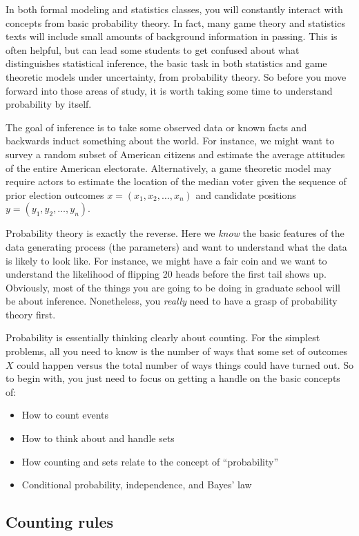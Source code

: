 \documentclass[11pt]{article}
\newcommand{\bi}{\begin{itemize}}
\newcommand{\ei}{\end{itemize}}
\begin{document}
In both formal modeling and statistics classes, you will constantly
interact with concepts from basic probability theory.  In fact, many
game theory and statistics texts will include small amounts of
background information in passing.  This is often helpful, but can
lead some students to get confused about what distinguishes
statistical inference, the basic task in both statistics and game
theoretic models under uncertainty, from probability theory.  So
before you move forward into those areas of study, it is worth taking
some time to understand probability by itself.

The goal of inference is to take some observed data or known facts and
backwards induct something about the world.  For instance, we might want
to survey a random subset of American citizens and estimate the
average attitudes of the entire American electorate.  Alternatively, a
game theoretic model may require actors to estimate the location of
the median voter given the sequence of prior election outcomes
$x=(x_1, x_2, \ldots, x_n)$ and candidate positions $y=(y_1, y_2,
\ldots, y_n)$.

Probability theory is exactly the reverse.  Here we \textit{know} the
basic features of the data generating process (the parameters) and
want to understand what the data is likely to look like.  For
instance, we might have a fair coin and we want to understand the
likelihood of flipping 20 heads before the first tail shows up.
Obviously, most of the things you are going to be doing in graduate
school will be about inference.  Nonetheless, you \textit{really}
need to have a grasp of probability theory first.  

Probability is essentially thinking clearly about counting.  For the
simplest problems, all you need to know is the number of ways that some
set of outcomes $X$ could happen versus the total number of ways
things could have turned out.  So to begin with, you just need to
focus on getting a handle on the basic concepts of:
\bi
\item How to count events
\item How to think about and handle sets
\item How counting and sets relate to the concept of ``probability''
\item Conditional probability, independence, and Bayes' law
\ei

\newpage

\subsection{Counting rules}
\end{document}
